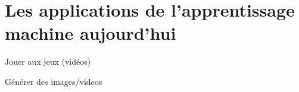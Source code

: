 \documentclass[aspectratio=169, usenames, dvipsnames]{beamer}
\begin{document}





\section{Les applications de l'apprentissage machine aujourd'hui}
\begin{frame}
  \sectionpage
\end{frame}

\begin{frame}[t, c]{Jouer aux jeux (vidéos)}{}
  \centering
  \vfill


  \vfill
\end{frame}

\begin{frame}[t, c]{Générer des images/videos}{}
  \centering
  \vfill


  \vfill
\end{frame}
\end{document}
